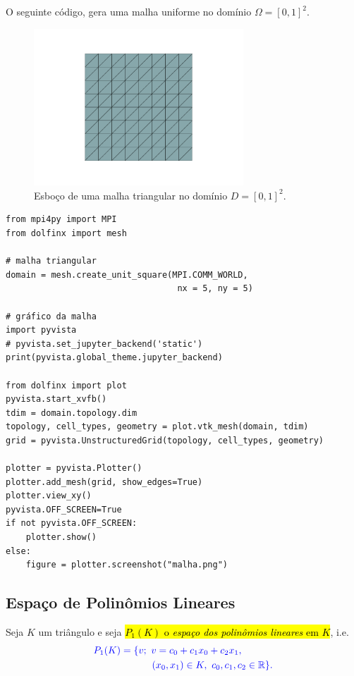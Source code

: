 \begin{ex}\label{cap_mef2d_sec_malha:ex:malha}
 O seguinte código, gera uma malha uniforme no domínio $\Omega = [0, 1]^2$.

 \begin{figure}[H]
  \centering
  \includegraphics[width=0.7\textwidth]{./cap_mef2d/dados/ex_malha/fig}
  \caption{Esboço de uma malha triangular no domínio $D = [0, 1]^2$.}
  \label{cap_mef2d_sec_malha:fig:ex_malha}
\end{figure}

 
\begin{lstlisting}[caption=ex\_malha.py]
from mpi4py import MPI
from dolfinx import mesh

# malha triangular
domain = mesh.create_unit_square(MPI.COMM_WORLD, 
                                  nx = 5, ny = 5)

# gráfico da malha
import pyvista
# pyvista.set_jupyter_backend('static')
print(pyvista.global_theme.jupyter_backend)

from dolfinx import plot
pyvista.start_xvfb()
tdim = domain.topology.dim
topology, cell_types, geometry = plot.vtk_mesh(domain, tdim)
grid = pyvista.UnstructuredGrid(topology, cell_types, geometry)

plotter = pyvista.Plotter()
plotter.add_mesh(grid, show_edges=True)
plotter.view_xy()
pyvista.OFF_SCREEN=True
if not pyvista.OFF_SCREEN:
    plotter.show()
else:
    figure = plotter.screenshot("malha.png")  
\end{lstlisting}
\end{ex}


\subsection{Espaço de Polinômios Lineares}
\badgeRevisar

Seja $K$ um triângulo e seja \hl{$P_1(K)$ o \emph{espaço dos polinômios lineares} em $K$}, i.e.
\begin{equation}\color{blue}\begin{aligned}
    &P_1(K) = \{v;~v=c_0+c_1x_0+c_2x_1,\\
    &\qquad\qquad\qquad(x_0,x_1)\in K,~c_0,c_1,c_2\in\mathbb{R}\}.
  \end{aligned}
\end{equation}

